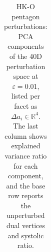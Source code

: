 \begin{table}[p]
\begin{tabular}{lccccccccccc}
\bottomrule
\end{tabular}
\caption{HK-O pentagon perturbations: PCA components of the 40D perturbation space at $\varepsilon = 0.01$, listed per facet as $\Delta a_i \in \mathbb{R}^4$. The last column shows explained variance ratio for each component, and the base row reports the unperturbed dual vertices and systolic ratio.}
\label{tab:pentagon-perturb-pca}
\end{table}
